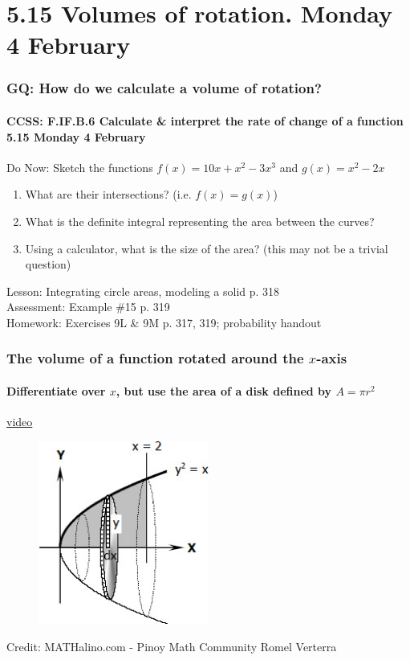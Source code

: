 \documentclass{beamer}
\begin{document}
  \section{5.15 Volumes of rotation. Monday 4 February}
  \frame
  {
    \frametitle{GQ: How do we calculate a volume of rotation?}
    \framesubtitle{CCSS: F.IF.B.6 Calculate \& interpret the rate of change of a function  \alert{5.15 Monday 4 February}}

    \begin{block}{Do Now: Sketch the functions $f(x)=10x+x^2-3x^3$ and $g(x)=x^2-2x$}
    \begin{enumerate}
        \item What are their intersections? (i.e. $f(x)=g(x)$)
        \item What is the definite integral representing the area between the curves?
        \item Using a calculator, what is the size of the area? (this may not be a trivial question)
    \end{enumerate}
    \end{block}
    Lesson: Integrating circle areas, modeling a solid p. 318\\%
    Assessment: Example \#15 p. 319 \\%
    Homework: Exercises 9L \& 9M p. 317, 319; probability handout
  }

  \frame
  {
    \frametitle{The volume of a function rotated around the $x$-axis}
    \framesubtitle{Differentiate over $x$, but use the area of a disk defined by $A=\pi r^2$}
  \href{https://www.youtube.com/watch?v=i4L5XoUBD_Q}{video}\\
  \begin{figure}[!ht]
      \centering
      \includegraphics[width=0.5\textwidth]{0413CW-paraboloid.jpg}
  \end{figure}
  \small{Credit: MATHalino.com - Pinoy Math Community Romel Verterra}
  }
\end{document}
